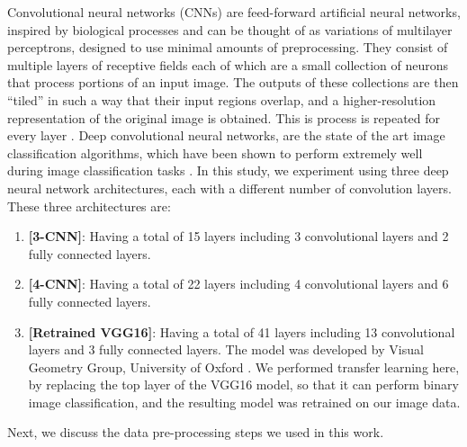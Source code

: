 \documentclass{sigkddExp}
\begin{document}
Convolutional neural networks (CNNs) are feed-forward artificial neural networks, inspired by biological processes and can be thought of as variations of multilayer perceptrons, designed to use minimal amounts of preprocessing. They consist of multiple layers of receptive fields each of which are a small collection of neurons that process portions of an input image. The outputs of these collections are then ``tiled'' in such a way that their input regions overlap, and a higher-resolution representation of the original image is obtained. This is process is repeated for every layer \cite{wiki:cnn}. Deep convolutional neural networks, are the state of the art image classification algorithms, which have been shown to perform extremely well during image classification tasks \cite{krizhevsky2012imagenet}. In this study, we experiment using three deep neural network architectures, each with a different number of convolution layers. These three architectures are:
\begin{enumerate}
\item \textbf{[3-CNN]}: Having a total of 15 layers including 3 convolutional layers and 2 fully connected layers.
\item \textbf{[4-CNN]}: Having a total of 22 layers including 4 convolutional layers and 6 fully connected layers.
\item \textbf{[Retrained VGG16]}: Having a total of 41 layers including 13 convolutional layers and 3 fully connected layers. The model was developed by Visual Geometry Group, University of Oxford \cite{Simonyan14c}. We performed transfer learning \cite{Oquab_2014_CVPR} here, by replacing the top layer of the VGG16 model, so that it can perform binary image classification, and the resulting model was retrained on our image data.
\end{enumerate}
Next, we discuss the data pre-processing steps we used in this work.
\end{document}
